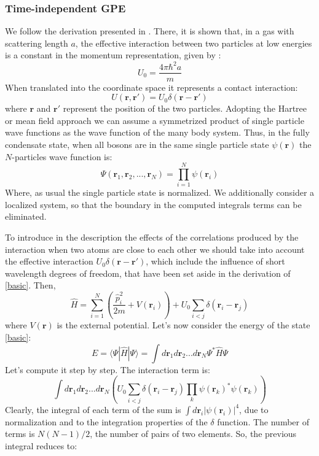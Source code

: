 \documentclass{article}
\begin{document}
\subsubsection*{Time-independent GPE}
We follow the derivation presented in \cite{Pethick}. There, it is shown that, in a gas with scattering length $a$, the effective interaction between two particles at low energies is a constant in the momentum representation, given by :
$$
 U_0=\frac{4 \pi \hbar^2a}{m}
$$
When translated into the coordinate space it represents a contact interaction:
$$
 U(\mathbf{r},\mathbf{r}')=U_0 \delta(\mathbf{r}-\mathbf{r}')
$$
where $\mathbf{r}$ and $\mathbf{r}'$ represent the position of the two particles. Adopting the Hartree or mean field approach we can assume a symmetrized product of single particle wave functions as the wave function of the many body system. Thus, in the fully condensate state, when all bosons are in the same single particle state $\psi(\mathbf{r})$ the $N$-particles wave function is:
\begin{equation} \label{basic}
 \Psi(\mathbf{r}_1,\mathbf{r}_2,...,\mathbf{r}_N)=\prod_{i=1}^{N}\psi(\mathbf{r}_i)
\end{equation}
Where, as usual the single particle state is normalized. We additionally consider a localized system, so that the boundary in the computed integrals terms can be eliminated.\par
To introduce in the description the effects of the correlations produced by the interaction when two atoms are close to each other  we should take into account the effective interaction $U_0\delta{(\mathbf{r}-\mathbf{r}')}$, which include the influence of short wavelength degrees of freedom, that have been set aside in the derivation of \eqref{basic}. Then, 
$$
 \hat{H}=\sum_{i=1}^N \left(\frac{\hat{p}_i^2}{2m}+V(\mathbf{r}_i)\right)+U_0\sum_{i<j}\delta(\mathbf{r}_i-\mathbf{r}_j)
$$
where $V(\mathbf{r})$ is the external potential. Let's now consider the energy of the state \eqref{basic}:
\begin{equation}\label{En_Statev}
 E=\langle\Psi|\hat{H}|\Psi\rangle=\int d\mathbf{r}_1 d\mathbf{r}_2 ... d\mathbf{r}_N \Psi^{*}\hat{H}\Psi
\end{equation}
Let's compute it step by step. The interaction term is:
$$
\int  d\mathbf{r}_1 d\mathbf{r}_2 ... d\mathbf{r}_N \left( U_0\sum_{i<j}\delta(\mathbf{r}_i-\mathbf{r}_j)\prod_{k}\psi(\mathbf{r}_k)^{*}\psi(\mathbf{r}_k)\right)
$$
Clearly, the integral of each term of the sum is $\int d\mathbf{r}_i |\psi(\mathbf{r}_i)|^4$, due to normalization and to the integration properties of the $\delta$ function. The number of terms is $N(N-1)/2$, the number of pairs of two elements. So, the previous integral reduces to:
\end{document}
